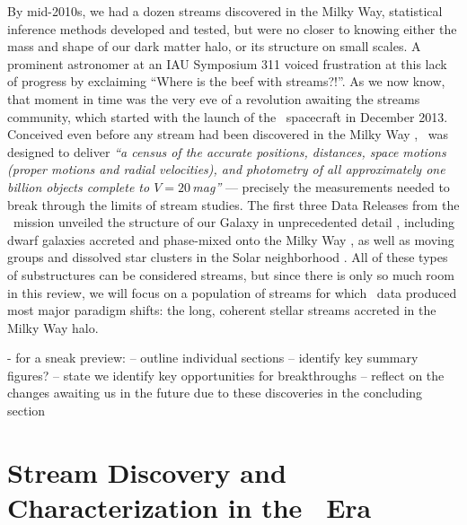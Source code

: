 \documentclass[final,5p,times,twocolumn,authoryear]{elsarticle}
\begin{document}
By mid-2010s, we had a dozen streams discovered in the Milky Way, statistical inference methods developed and tested, but were no closer to knowing either the mass and shape of our dark matter halo, or its structure on small scales.
A prominent astronomer at an IAU Symposium 311 voiced frustration at this lack of progress by exclaiming ``Where is the beef with streams?!''.
As we now know, that moment in time was the very eve of a revolution awaiting the streams community, which started with the launch of the \gaia\ spacecraft in December 2013.
Conceived even before any stream had been discovered in the Milky Way \citep{lindegren:1993, battrick:1994, lindegren:1996}, \gaia\ was designed to deliver \emph{``a census of the accurate positions, distances, space motions (proper motions and radial velocities), and photometry of all approximately one billion objects complete to $V=20$\,mag''} \citep{perryman:2001} --- precisely the measurements needed to break through the limits of stream studies.
The first three Data Releases from the \gaia\ mission unveiled the structure of our Galaxy in unprecedented detail \citep{babusiaux:2018, helmi:2018, katz:2018, antoja:2021, smart:2021, drimmel:2023, schultheis:2023}, including dwarf galaxies accreted and phase-mixed onto the Milky Way \citep{helmi, belokurov, myeong, naidu:2020, kraken}, as well as moving groups and dissolved star clusters in the Solar neighborhood \citep{hyades, pleiades, hercules}.
All of these types of substructures can be considered streams, but since there is only so much room in this review, we will focus on a population of streams for which \gaia\ data produced most major paradigm shifts: the long, coherent stellar streams accreted in the Milky Way halo.

- for a sneak preview:
-- outline individual sections
-- identify key summary figures?
-- state we identify key opportunities for breakthroughs
-- reflect on the changes awaiting us in the future due to these discoveries in the concluding section



\section{Stream Discovery and Characterization in the \gaia\ Era}
\label{sec:discovery}
\end{document}
